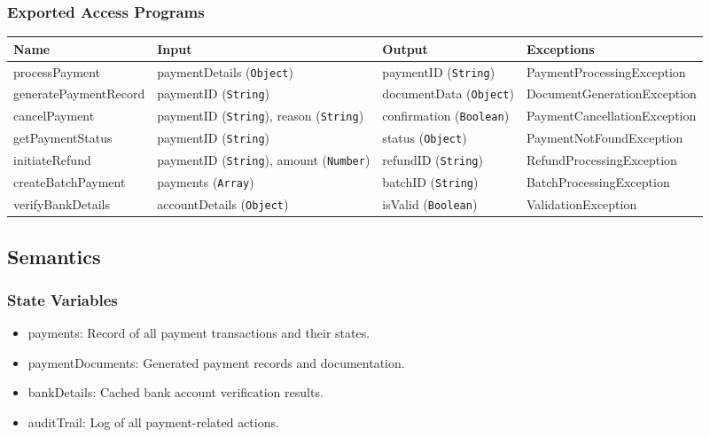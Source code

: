 \documentclass[12pt, titlepage]{article}
\begin{document}
\subsubsection{Exported Access Programs}
\begin{center}
    \begin{tabular}{p{2cm} p{4cm} p{4cm} p{2cm}}
        \hline
        \textbf{Name} & \textbf{Input} & \textbf{Output} & \textbf{Exceptions} \\
        \hline
        processPayment & paymentDetails (\texttt{Object}) & paymentID (\texttt{String}) & PaymentProcessingException \\
        \hline
        generatePaymentRecord & paymentID (\texttt{String}) & documentData (\texttt{Object}) & DocumentGenerationException \\
        \hline
        cancelPayment & paymentID (\texttt{String}), reason (\texttt{String}) & confirmation (\texttt{Boolean}) & PaymentCancellationException \\
        \hline
        getPaymentStatus & paymentID (\texttt{String}) & status (\texttt{Object}) & PaymentNotFoundException \\
        \hline
        initiateRefund & paymentID (\texttt{String}), amount (\texttt{Number}) & refundID (\texttt{String}) & RefundProcessingException \\
        \hline
        createBatchPayment & payments (\texttt{Array}) & batchID (\texttt{String}) & BatchProcessingException \\
        \hline
        verifyBankDetails & accountDetails (\texttt{Object}) & isValid (\texttt{Boolean}) & ValidationException \\
        \hline
    \end{tabular}
\end{center}

\subsection{Semantics}
\subsubsection{State Variables}
\begin{itemize}
    \item payments: Record of all payment transactions and their states.
    \item paymentDocuments: Generated payment records and documentation.
    \item bankDetails: Cached bank account verification results.
    \item auditTrail: Log of all payment-related actions.
\end{itemize}
\end{document}
